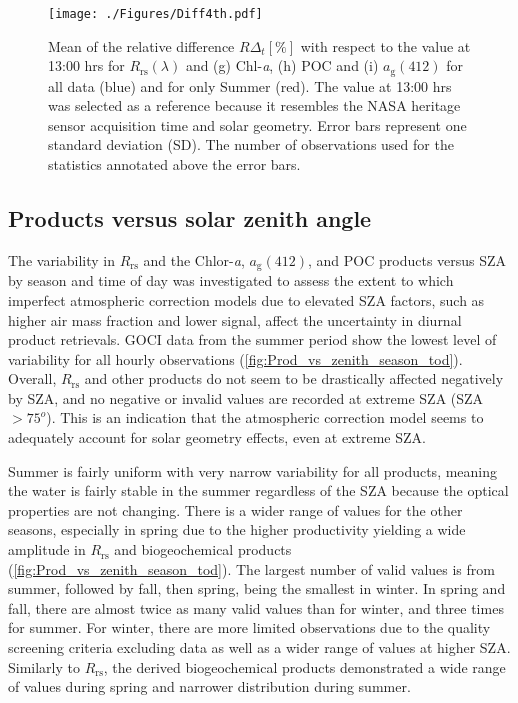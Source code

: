 \documentclass[remotesensing,article,submit,moreauthors,pdftex,10pt,a4paper]{Definitions/mdpi}
\begin{document}
               
\begin{figure}[htbp!]
  \centering
  \texttt{[image: ./Figures/Diff4th.pdf]}
    \caption{Mean of the relative difference $R\Delta_t[\%]$ with respect to the value at 13:00 hrs for $R_\text{rs}(\lambda)$ and (g) Chl-{\it a}, (h) POC and (i) $a_\text{g}(412)$ for all data (blue) and for only Summer (red). The value at 13:00 hrs was selected as a reference because it resembles the NASA heritage sensor acquisition time and solar geometry. Error bars represent one standard deviation (SD). The number of observations used for the statistics annotated above the error bars. \label{fig:Diff4th} } 
\end{figure}

\subsection{Products versus solar zenith angle}
The variability in $R_\text{rs}$ and the Chlor-{\it a}, $a_\text{g}(412)$, and POC products versus SZA by season and time of day was investigated to assess the extent to which imperfect atmospheric correction models due to elevated SZA factors, such as higher air mass fraction and lower signal, affect the uncertainty in diurnal product retrievals. GOCI data from the summer period show the lowest level of variability for all hourly observations (\autoref{fig:Prod_vs_zenith_season_tod}). Overall, $R_\text{rs}$ and other products do not seem to be drastically affected negatively by SZA, and no negative or invalid values are recorded at extreme SZA (SZA$>75^o$). This is an indication that the atmospheric correction model seems to adequately account for solar geometry effects, even at extreme SZA.

Summer is fairly uniform with very narrow variability for all products, meaning the water is fairly stable in the summer regardless of the SZA because the optical properties are not changing. There is a wider range of values for the other seasons, especially in spring due to the higher productivity yielding a wide amplitude in $R_\text{rs}$ and biogeochemical products (\autoref{fig:Prod_vs_zenith_season_tod}). The largest number of valid values is from summer, followed by fall, then spring, being the smallest in winter. In spring and fall, there are almost twice as many valid values than for winter, and three times for summer. For winter, there are more limited observations due to the quality screening criteria excluding data as well as a wider range of values at higher SZA. Similarly to $R_\text{rs}$, the derived biogeochemical products demonstrated a wide range of values during spring and narrower distribution during summer.
\end{document}
